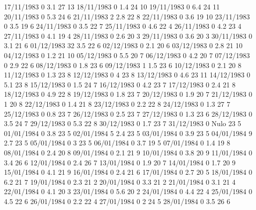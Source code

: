 17/11/1983  0      3.1    27     13 
18/11/1983  0      1.4    24     10 
19/11/1983  0      6.4    24     11 
20/11/1983  0      5.3    24     6 
21/11/1983  2      2.8    22     8 
22/11/1983  0      3.6    19     10 
23/11/1983  0      3.5    19     6 
24/11/1983  0      3.5    22     7 
25/11/1983  0      4.6    22     4 
26/11/1983  0      4.2    23     4 
27/11/1983  0      4.1    19     4 
28/11/1983  0      2.6    20     3 
29/11/1983  0      3.6    20     3 
30/11/1983  0      3.1    21     6 
01/12/1983  32     3.5    22     6 
02/12/1983  0      2.1    20     6 
03/12/1983  0      2.8    21     10 
04/12/1983  0      1.2    21     10 
05/12/1983  0      5.5    20     7 
06/12/1983  0      4.2    20     7 
07/12/1983  0      2.9    22     6 
08/12/1983  0      1.8    23     6 
09/12/1983  1      1.5    23     6 
10/12/1983  0      2.1    20     8 
11/12/1983  0      1.3    23     8 
12/12/1983  0      4      23     8 
13/12/1983  0      4.6    23     11 
14/12/1983  0      5.1    23     8 
15/12/1983  0      1.5    24     7 
16/12/1983  0      4.2    23     7 
17/12/1983  0      2.4    21     8 
18/12/1983  0      4.9    22     8 
19/12/1983  0      1.8    23     7 
20/12/1983  0      1.9    20     7 
21/12/1983  0      1      20     8 
22/12/1983  0      1.4    21     8 
23/12/1983  0      2.2    22     8 
24/12/1983  0      1.3    27     7 
25/12/1983  0      0.8    23     7 
26/12/1983  0      2.5    23     7 
27/12/1983  0      1.3    23     6 
28/12/1983  0      3.5    24     7 
29/12/1983  0      5.3    22     8 
30/12/1983  0      1.7    23     7 
31/12/1983  0     Nulo    23     5 
01/01/1984  0      3.8    23     5 
02/01/1984  5      2.4    23     5 
03/01/1984  0      3.9    23     5 
04/01/1984  9      2.7    23     5 
05/01/1984  0      3      23     5 
06/01/1984  0      3.7    19     5 
07/01/1984  0      1.4    19     8 
08/01/1984  0      2.4    20     8 
09/01/1984  0      2.1    21     9 
10/01/1984  0      3.8    20     9 
11/01/1984  0      3.4    26     6 
12/01/1984  0      2.4    26     7 
13/01/1984  0      1.9    20     7 
14/01/1984  0      1.7    20     9 
15/01/1984  0      4.1    21     9 
16/01/1984  0      2.4    21     6 
17/01/1984  0      2.7    20     5 
18/01/1984  0      6.2    21     7 
19/01/1984  0      2.3    21     2 
20/01/1984  0      3.3    21     2 
21/01/1984  0      3.1    21     4 
22/01/1984  0      4.1    20     3 
23/01/1984  0      5.6    20     2 
24/01/1984  0      4.4    22     4 
25/01/1984  0      4.5    22     6 
26/01/1984  0      2.2    22     4 
27/01/1984  0      2      24     5 
28/01/1984  0      3.5    26     6 
